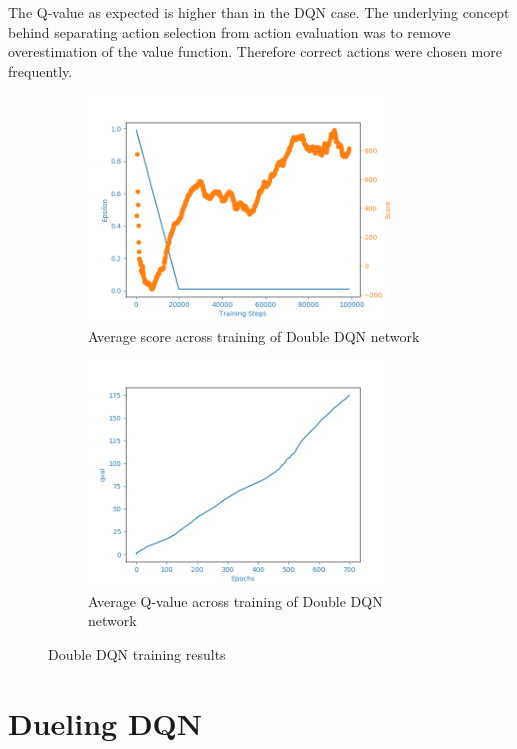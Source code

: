 The Q-value as expected is higher than in the DQN case. The underlying concept behind separating action selection from action evaluation
was to remove overestimation of the value function. Therefore correct actions were chosen more frequently.

\begin{figure}[htb]
\begin{subfigure}{.48\textwidth}
    \centering
    \includegraphics[width=8cm]{img/DDQNAgent_WamvNavTwoSetsBuoys-v0_normal_1126_0854.png}
    \caption{Average score across training of Double DQN network}
    \label{fig:avg-score-ddqn}
\end{subfigure}
\begin{subfigure}{.48\textwidth}
    \centering
    \includegraphics[width=8cm]{img/DDQNAgent_WamvNavTwoSetsBuoys-v0_normal_1126_0854_qval.png}
    \caption{Average Q-value across training of Double DQN network}
\end{subfigure}
\caption{Double DQN training results}
\label{fig:ddqn-results}
\end{figure}

\newpage

\section{Dueling DQN}
\label{sec:results-dueling-dqn}


